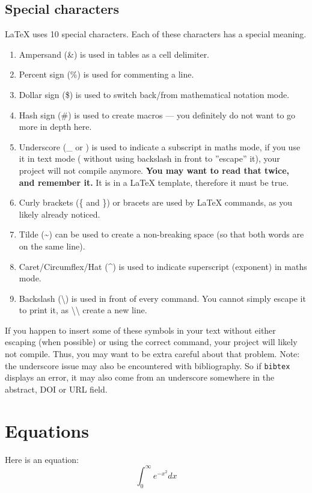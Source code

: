 \subsection{Special characters}
LaTeX uses 10 special characters. Each of these characters has a special meaning.
\begin{enumerate}
  \item Ampersand (\&) is used in tables as a cell delimiter.
  \item Percent sign (\%) is used for commenting a line.
  \item Dollar sign (\$) is used to switch back/from mathematical notation mode.
  \item Hash sign (\#) is used to create macros --- you definitely do not want to go more in depth here.
  \item Underscore (\_ or \textunderscore) is used to indicate a subscript in maths mode, if you use it in text mode ( without using backslash in front to ''escape'' it), your project will not compile anymore. \textbf{You may want to read that twice, and remember it.} It is in a LaTeX template, therefore it must be true.
  \item Curly brackets (\{ and \}) or bracets are used by LaTeX commands, as you likely already noticed.
  \item Tilde (\textasciitilde) can be used to create a non-breaking space (so that both words are on the same line).
  \item Caret/Circumflex/Hat (\textasciicircum) is used to indicate superscript (exponent) in maths mode.
  \item Backslash (\textbackslash) is used in front of every command. You cannot simply escape it to print it, as \textbackslash{}\textbackslash{} create a new line.
\end{enumerate}
If you happen to insert some of these symbols in your text without either escaping (when possible) or using the correct command, your project will likely not compile.
Thus, you may want to be extra careful about that problem.
Note: the underscore issue may also be encountered with bibliography.
So if \texttt{bibtex} displays an error, it may also come from an underscore somewhere in the abstract, DOI or URL field.

\section{Equations}
Here is an equation:
\begin{equation}
\int_0^\infty e^{-x^2} dx
\label{eq:eq1}
\end{equation}

